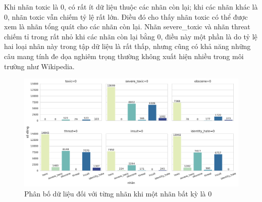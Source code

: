 Khi nhãn toxic là $0$, có rất ít dữ liệu thuộc các nhãn còn lại; khi các nhãn khác là $0$, nhãn toxic vẫn chiếm tỷ lệ rất lớn. Điều đó cho thấy nhãn toxic có thể được xem là nhãn tổng quát cho các nhãn còn lại. Nhãn severe\_toxic và nhãn threat chiếm tỉ trong rất nhỏ khi các nhãn còn lại bằng $0$, điều này một phần là do tỷ lệ hai loại nhãn này trong tập dữ liệu là rất thấp, nhưng cũng có khả năng những câu mang tính đe dọa nghiêm trọng thường không xuất hiện nhiều trong môi trường như Wikipedia.
\begin{figure}[htb]
    \centering
    \includegraphics[width=\textwidth]{chapter_2/image/num_records_per_label_without_one_label.pdf}
    \caption{Phân bố dữ liệu đối với từng nhãn khi một nhãn bất kỳ là $0$}
\end{figure}
\clearpage

